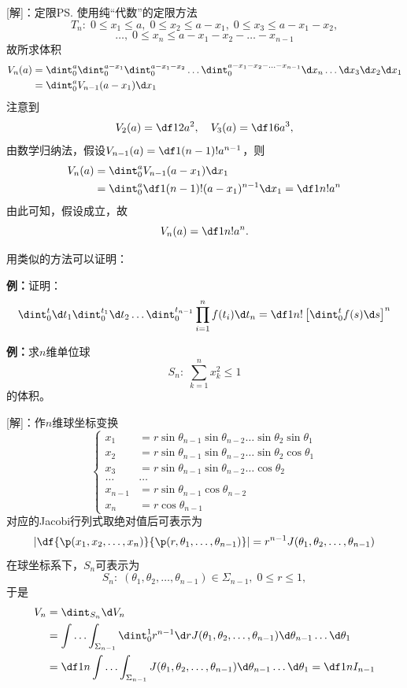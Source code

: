 [解]：定限\ps{使用纯“代数”的定限方法}
$$T_n:\;0\leq x_1\leq a,\;0\leq x_2\leq a-x_1,\;
0\leq x_3\leq a-x_1-x_2,$$
$$\ldots,\;0\leq x_n\leq a-x_1-x_2-\ldots-x_{n-1}$$
故所求体积
\begin{align*}
	V_n(a)&=\dint_0^a\dint_0^{a-x_1}\dint_0^{a-x_1-x_2}\ldots
	\dint_0^{a-x_1-x_2-\ldots-x_{n-1}}\d x_{n}\ldots\d x_3\d x_2\d x_1\\
	&=\dint_0^aV_{n-1}(a-x_1)\d x_1
\end{align*}
注意到
$$V_2(a)=\df12a^2,\quad V_3(a)=\df16a^3,$$
由数学归纳法，假设$V_{n-1}(a)=\df1{(n-1)!}a^{n-1}$，则
\begin{align*}
	V_n(a)&=\dint_0^aV_{n-1}(a-x_1)\d x_1\\
	&=\dint_0^a\df1{(n-1)!}(a-x_1)^{n-1}\d x_1=\df1{n!}a^n
\end{align*}
由此可知，假设成立，故
$$V_n(a)=\df1{n!}a^n.$$

用类似的方法可以证明：

{\bf 例：}证明：
$$\dint_0^t\d t_1\dint_0^{t_1}\d t_2\ldots
\dint_0^{t_{n-1}}\prod\limits_{i=1}^nf(t_i)\d t_n
=\df 1{n!}\left[\dint_0^tf(s)\d s\right]^n$$

{\bf 例：}求$n$维单位球
$$S_n:\;\sum\limits_{k=1}^nx_k^2\leq 1$$
的体积。

[解]：作$n$维球坐标变换
$$
\left\{\begin{array}{rl}
	x_1&=r\sin\theta_{n-1}\sin\theta_{n-2}\ldots\sin\theta_{2}\sin\theta_1\\
	x_2&=r\sin\theta_{n-1}\sin\theta_{n-2}\ldots\sin\theta_{2}\cos\theta_1\\
	x_3&=r\sin\theta_{n-1}\sin\theta_{n-2}\ldots\cos\theta_{2}\\
	\ldots&\ldots\\
	x_{n-1}&=r\sin\theta_{n-1}\cos\theta_{n-2}\\
	x_n&=r\cos\theta_{n-1}
\end{array}\right.
$$
对应的Jacobi行列式取绝对值后可表示为
$$\left|\df{\p(x_1,x_2,\ldots,x_n)}{\p(r,\theta_1,\ldots,\theta_{n-1})}\right|
=r^{n-1}J(\theta_1,\theta_2,\ldots,\theta_{n-1})$$
在球坐标系下，$S_n$可表示为
$$S_n:
\;(\theta_1,\theta_2,\ldots,\theta_{n-1})\in\Sigma_{n-1},
\;0\leq r\leq 1,$$
于是
\begin{align*}
	V_n&=\dint_{S_n}\d V_n\\
	&=\int\ldots\int_{\Sigma_{n-1}}\dint_0^1
	r^{n-1}\d rJ(\theta_1,\theta_2,\ldots,\theta_{n-1})
	\d\theta_{n-1}\ldots\d\theta_1\\
	&=\df1n\int\ldots\int_{\Sigma_{n-1}}
	J(\theta_1,\theta_2,\ldots,\theta_{n-1})\d\theta_{n-1}\ldots\d\theta_1
	=\df1nI_{n-1}
\end{align*}

